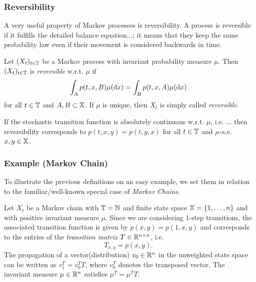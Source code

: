 \subsubsection*{Reversibility}

A very useful property of Markov processes is reversibility.
A process is reversible if it fulfills the detailed balance equation...;
it means that they keep the same probability law even if their movement is considered backwards in time.


\begin{defi}
Let $(X_t)_{t\in\mathbb{T}}$ be a Markov process with invariant probability measure $\mu$. Then $(X_t)_{t\in\mathbb{T}}$ is \textit{reversible} w.r.t. $\mu$ if 
\begin{equation*}
\int_A p(t,x,B) \mu(\mathop{}\!\mathrm{d} x) = \int_B p(t,x,A) \mu(\mathop{}\!\mathrm{d} x)
\end{equation*}
for all $t \in \mathbb{T}$ and $A,B \subset \mathbb{X}$. If $\mu$ is unique, then $X_t$ is simply called \textit{reversible}. 
\end{defi}

If the stochastic transition function is absolutely continuous w.r.t. $\mu$, i.e. ...
then reversibility corresponds to $p(t,x,y)=p(t,y,x)$ for all $t \in \mathbb{T}$ and $\mu$-a.e. $x,y  \in \mathbb{X}$. 

\subsubsection*{Example (Markov Chain)}

To illustrate the previous definitions on an easy example, we set them in relation to the familiar/well-known special case of \textit{Markov Chains}.

Let $X_t$ be a Markov chain with $\mathbb{T} = \mathbb{N}$ and finite state space $\mathbb{X} = \{1,\dots,n\}$ and with positive invariant measure $\mu$. Since we are considering $1$-step transitions, the associated transition function is given by $p(x,y) = p(1,x,y)$ and corresponds to the entries of the \textit{transition matrix} $T\in \mathbb{R}^{n \times n}$, i.e.
\begin{equation*}
T_{x,y} = p(x,y).
\end{equation*}
The propagation of a vector(distribution) $v_0 \in \mathbb{R}^n$ in the unweighted state space can be written as $v_1^T = v_0^T T$, where $v_0^T$ denotes the transposed vector. 
The invariant measure $\mu \in \mathbb{R}^n$ satisfies $\mu^T = \mu^T T$. 